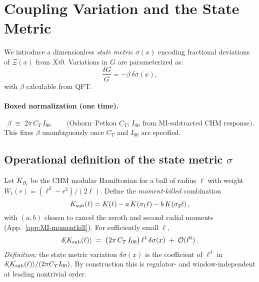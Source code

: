 \documentclass[aps,prd,onecolumn,superscriptaddress,nofootinbib]{revtex4-2}
\def\XiVac{Xi0}%
\def\boxed#1{#1}%
\newcommand{\XiVac}{\Xi_0}
\begin{document}
\section{Coupling Variation and the State Metric}
\label{sec:state-metric}
We introduce a dimensionless \emph{state metric} \(\sigma(x)\) encoding fractional deviations of \(\Xi(x)\) from \(\XiVac\). Variations in \(G\) are parameterized as:
\begin{equation}
\frac{\delta G}{G} = -\beta \, \delta\sigma(x),
\label{eq:beta-def}
\end{equation}
with \(\beta\) calculable from QFT.

\paragraph*{Boxed normalization (one time).}
\begin{equation}
\boxed{\ \beta \;\equiv\; 2\pi\, C_T\, I_{00}\ }\qquad
\text{(Osborn--Petkou \(C_T\); \(I_{00}\) from MI-subtracted CHM response).}
\label{eq:beta-box}
\end{equation}
This fixes \(\beta\) unambiguously once \(C_T\) and \(I_{00}\) are specified.

\subsection{Operational definition of the state metric \texorpdfstring{\(\sigma\)}{sigma}}
\label{sec:sigma-def}
Let \(K_{B_\ell}\) be the CHM modular Hamiltonian for a ball of radius \(\ell\) with weight \(W_\ell(r)=(\ell^2-r^2)/(2\ell)\). Define the \emph{moment-killed} combination
\begin{equation}
K_{\rm sub}(\ell)=K(\ell)-a\,K(\sigma_1\ell)-b\,K(\sigma_2\ell)\,,
\end{equation}
with \((a,b)\) chosen to cancel the zeroth and second radial moments (App.~\ref{app:MI-momentkill}). For sufficiently small \(\ell\),
\begin{equation}
\delta\!\langle K_{\rm sub}(\ell)\rangle \;=\; \big(2\pi\, C_T\, I_{00}\big)\, \ell^4\, \delta\sigma(x) \;+\; \mathcal O(\ell^6)\,.
\label{eq:sigma-operational}
\end{equation}
\emph{Definition:} the state metric variation \(\delta\sigma(x)\) is the coefficient of \(\ell^4\) in \(\delta\!\langle K_{\rm sub}(\ell)\rangle/(2\pi C_T I_{00})\). By construction this is regulator- and window-independent at leading nontrivial order.
\end{document}
